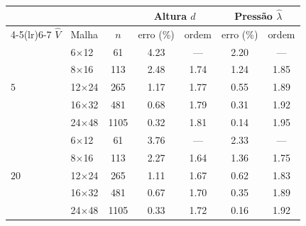 \begin{tabular}{llccccc}
\toprule
 & & & \multicolumn{2}{c}{Altura $\hat d$} & \multicolumn{2}{c}{Pressão $\hat\lambda$} \\
\cmidrule(lr){4-5}\cmidrule(lr){6-7}
$\hat V$ & Malha & $n$ & erro (\%) & ordem & erro (\%) & ordem \\
\midrule
\multirow{5}{*}{$5$} & 6$\times$12 & 61 & \num{4.23} & --- & \num{2.20} & --- \\
 & 8$\times$16 & 113 & \num{2.48} & \num{1.74} & \num{1.24} & \num{1.85} \\
 & 12$\times$24 & 265 & \num{1.17} & \num{1.77} & \num{0.55} & \num{1.89} \\
 & 16$\times$32 & 481 & \num{0.68} & \num{1.79} & \num{0.31} & \num{1.92} \\
 & 24$\times$48 & 1105 & \num{0.32} & \num{1.81} & \num{0.14} & \num{1.95} \\
\midrule
\multirow{5}{*}{$20$} & 6$\times$12 & 61 & \num{3.76} & --- & \num{2.33} & --- \\
 & 8$\times$16 & 113 & \num{2.27} & \num{1.64} & \num{1.36} & \num{1.75} \\
 & 12$\times$24 & 265 & \num{1.11} & \num{1.67} & \num{0.62} & \num{1.83} \\
 & 16$\times$32 & 481 & \num{0.67} & \num{1.70} & \num{0.35} & \num{1.89} \\
 & 24$\times$48 & 1105 & \num{0.33} & \num{1.72} & \num{0.16} & \num{1.92} \\
\bottomrule
\end{tabular}
